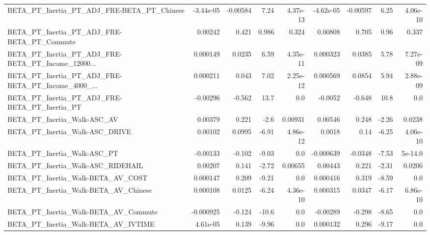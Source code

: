 \begin{tabular}{lrrrrrrrr}
BETA\_PT\_Inertia\_PT\_ADJ\_FRE-BETA\_PT\_Chinese         &   -3.44e-05 &     -0.00584 &     7.24 & 4.37e-13 &  -4.62e-05 &    -0.00597 &         6.25 &      4.06e-10 \\
BETA\_PT\_Inertia\_PT\_ADJ\_FRE-BETA\_PT\_Commute         &     0.00242 &        0.421 &    0.986 &    0.324 &    0.00808 &       0.705 &         0.96 &         0.337 \\
BETA\_PT\_Inertia\_PT\_ADJ\_FRE-BETA\_PT\_Income\_12000... &    0.000149 &       0.0235 &     6.59 & 4.35e-11 &   0.000323 &      0.0385 &         5.78 &      7.27e-09 \\
BETA\_PT\_Inertia\_PT\_ADJ\_FRE-BETA\_PT\_Income\_4000\_... &    0.000211 &        0.043 &     7.02 & 2.25e-12 &   0.000569 &      0.0854 &         5.94 &      2.88e-09 \\
BETA\_PT\_Inertia\_PT\_ADJ\_FRE-BETA\_PT\_Inertia\_PT      &    -0.00296 &       -0.562 &     13.7 &      0.0 &    -0.0052 &      -0.648 &         10.8 &           0.0 \\
BETA\_PT\_Inertia\_Walk-ASC\_AV                        &     0.00379 &        0.221 &     -2.6 &  0.00931 &    0.00546 &       0.248 &        -2.26 &        0.0238 \\
BETA\_PT\_Inertia\_Walk-ASC\_DRIVE                     &     0.00102 &       0.0995 &    -6.91 & 4.86e-12 &     0.0018 &        0.14 &        -6.25 &      4.06e-10 \\
BETA\_PT\_Inertia\_Walk-ASC\_PT                        &    -0.00133 &       -0.102 &    -9.03 &      0.0 &  -0.000639 &     -0.0348 &        -7.53 &       5e-14.0 \\
BETA\_PT\_Inertia\_Walk-ASC\_RIDEHAIL                  &     0.00207 &        0.141 &    -2.72 &  0.00655 &    0.00443 &       0.221 &        -2.31 &        0.0206 \\
BETA\_PT\_Inertia\_Walk-BETA\_AV\_COST                  &    0.000147 &        0.209 &    -9.21 &      0.0 &   0.000416 &       0.319 &        -8.59 &           0.0 \\
BETA\_PT\_Inertia\_Walk-BETA\_AV\_Chinese               &    0.000108 &       0.0125 &    -6.24 & 4.36e-10 &   0.000315 &      0.0347 &        -6.17 &      6.86e-10 \\
BETA\_PT\_Inertia\_Walk-BETA\_AV\_Commute               &   -0.000925 &       -0.124 &    -10.6 &      0.0 &   -0.00289 &      -0.298 &        -8.65 &           0.0 \\
BETA\_PT\_Inertia\_Walk-BETA\_AV\_IVTIME                &    4.61e-05 &        0.139 &    -9.96 &      0.0 &   0.000132 &       0.296 &        -9.17 &           0.0 \\

\end{tabular}
